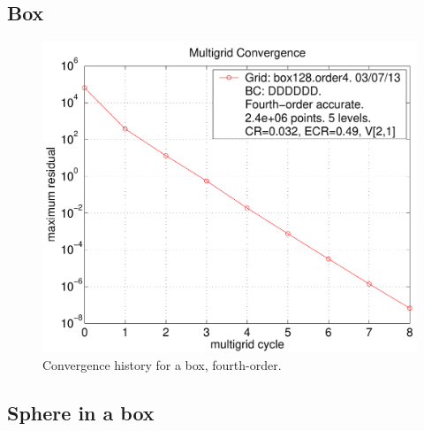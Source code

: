 \documentclass{article}
\begin{document}
\subsection{Box}

\renewcommand{\figWidth}{.495\linewidth}
\begin{figure}
\begin{center}
\includegraphics[width=\figWidth]{fig/residual-box128-order4}
\end{center}
\caption{Convergence history for a box, fourth-order.}
\label{fig:box}
\end{figure}


\subsection{Sphere in a box}
\end{document}
